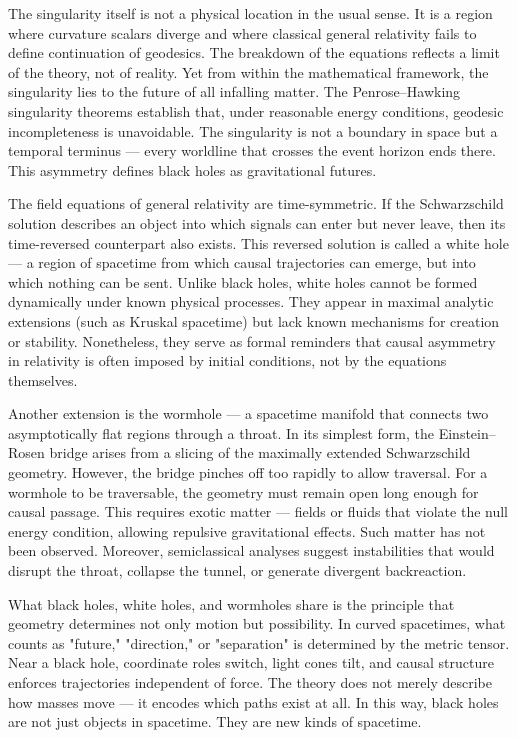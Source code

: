 The singularity itself is not a physical location in the usual sense. It is a region where curvature scalars diverge and where classical general relativity fails to define continuation of geodesics. The breakdown of the equations reflects a limit of the theory, not of reality. Yet from within the mathematical framework, the singularity lies to the future of all infalling matter. The Penrose–Hawking singularity theorems establish that, under reasonable energy conditions, geodesic incompleteness is unavoidable. The singularity is not a boundary in space but a temporal terminus — every worldline that crosses the event horizon ends there. This asymmetry defines black holes as gravitational futures.


The field equations of general relativity are time-symmetric. If the Schwarzschild solution describes an object into which signals can enter but never leave, then its time-reversed counterpart also exists. This reversed solution is called a white hole — a region of spacetime from which causal trajectories can emerge, but into which nothing can be sent. Unlike black holes, white holes cannot be formed dynamically under known physical processes. They appear in maximal analytic extensions (such as Kruskal spacetime) but lack known mechanisms for creation or stability. Nonetheless, they serve as formal reminders that causal asymmetry in relativity is often imposed by initial conditions, not by the equations themselves.


Another extension is the wormhole — a spacetime manifold that connects two asymptotically flat regions through a throat. In its simplest form, the Einstein–Rosen bridge arises from a slicing of the maximally extended Schwarzschild geometry. However, the bridge pinches off too rapidly to allow traversal. For a wormhole to be traversable, the geometry must remain open long enough for causal passage. This requires exotic matter — fields or fluids that violate the null energy condition, allowing repulsive gravitational effects. Such matter has not been observed. Moreover, semiclassical analyses suggest instabilities that would disrupt the throat, collapse the tunnel, or generate divergent backreaction.


What black holes, white holes, and wormholes share is the principle that geometry determines not only motion but possibility. In curved spacetimes, what counts as "future," "direction," or "separation" is determined by the metric tensor. Near a black hole, coordinate roles switch, light cones tilt, and causal structure enforces trajectories independent of force. The theory does not merely describe how masses move — it encodes which paths exist at all. In this way, black holes are not just objects in spacetime. They are new kinds of spacetime.

